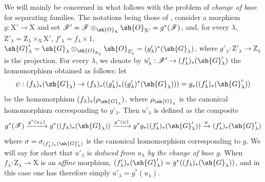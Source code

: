 \begin{env}[11.9.5]
\label{IV.11.9.5}
We will mainly be concerned in what follows with the problem of \emph{change of base} for separating families.
The notations being those of , consider a morphism $g:\mathrm{X}'\to\mathrm{X}$ and set $\mathscr{F}'=\mathscr{F}\otimes_{\sh{O}_\mathrm{X}}\sh{O}_{\mathrm{X}'}=g^*(\mathscr{F})$, and, for every $\lambda$, $\mathrm{Z}'_\lambda=\mathrm{Z}_\lambda\times_\mathrm{X}\mathrm{X}'$, $f'_\lambda=f_\lambda\times 1$, $\sh{G}'_\lambda=\sh{G}_\lambda\otimes_{\sh{O}_{\mathrm{Z}_\lambda}}\sh{O}_{\mathrm{Z}'_\lambda}=(g'_\lambda)^*(\sh{G}_\lambda)$, where $g'_\lambda:\mathrm{Z}'_\lambda\to\mathrm{Z}_\lambda$ is the projection.
For every $\lambda$, we denote by $u'_\lambda:\mathscr{F}'\to(f'_\lambda)_*(\sh{G}'_\lambda)$ the homomorphism obtained as follows: let
\[
  \psi:(f_\lambda)_*(\sh{G}_\lambda)\to(f_\lambda)_*((g'_\lambda)_*((g'_\lambda)^*(\sh{G}_\lambda)))=g_*((f'_\lambda)_*(\sh{G}'_\lambda))
\]
be the homomorphism $(f_\lambda)_*(\rho_{\sh{G}_\lambda})$, where $\rho_{\sh{G}_\lambda}$ is the canonical homomorphism  corresponding to $g'_\lambda$.
Then $u'_\lambda$ is defined as the composite
\[
  g^*(\mathscr{F})\xrightarrow{g^*(u_\lambda)}g^*((f_\lambda)_*(\sh{G}_\lambda))\xrightarrow{g^*(\psi)}g^*g_*((f'_\lambda)_*(\sh{G}'_\lambda))\xrightarrow{\sigma}(f'_\lambda)_*(\sh{G}'_\lambda)
\]
where $\sigma=\sigma_{(f'_\lambda)_*(\sh{G}'_\lambda)}$ is the canonical homomorphism  corresponding to $g$.
We will say for short that $u'_\lambda$ is \emph{deduced from $u_\lambda$ by the change of base} $g$.
When $f_\lambda:\mathrm{Z}_\lambda\to\mathrm{X}$ is an \emph{affine} morphism, $(f'_\lambda)_*(\sh{G}'_\lambda)=g^*((f_\lambda)_*(\sh{G}_\lambda))$, and in this case one has therefore simply $u'_\lambda=g^*(u_\lambda)$.


\end{env}
